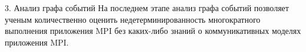 3.	Анализ графа событий
На последнем этапе анализ графа событий позволяет ученым количественно оценить недетерминированность многократного выполнения приложения MPI без каких-либо знаний о коммуникативных моделях приложения MPI.






\noteattributes{}

